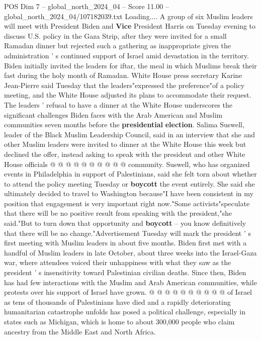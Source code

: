 \begin{textsample}{POS Dim 7 – global\_north\_2024\_04 – Score 11.00 – global\_north\_2024\_04/107182039.txt}  \label{ex:f7_pos_067}
Loading....
A group of six Muslim leaders will meet with President Biden and \textbf{Vice} President Harris on Tuesday evening to discuss U.S. policy in the Gaza Strip, after they were invited for a small Ramadan dinner but rejected such a gathering as inappropriate given the administration ' s continued support of Israel amid devastation in the territory.
Biden initially invited the leaders for iftar, the meal in which Muslims break their fast during the holy month of Ramadan.
White House press secretary Karine Jean-Pierre said Tuesday that the leaders"expressed the preference"of a policy meeting, and the White House adjusted its plans to accommodate their request.
The leaders ' refusal to have a dinner at the White House underscores the significant challenges Biden faces with the Arab American and Muslim communities seven months before the \textbf{presidential} \textbf{election}.
Salima Suswell, leader of the Black Muslim Leadership Council, said in an interview that she and other Muslim leaders were invited to dinner at the White House this week but declined the offer, instead asking to speak with the president and other White House officials @ @ @ @ @ @ @ @ @ @ community.
Suswell, who has organized events in Philadelphia in support of Palestinians, said she felt torn about whether to attend the policy meeting Tuesday or \textbf{boycott} the event entirely.
She said she ultimately decided to travel to Washington because"I have been consistent in my position that engagement is very important right now."Some activists"speculate that there will be no positive result from speaking with the president,"she said."But to turn down that opportunity and \textbf{boycott} -- you know definitively that there will be no change."Advertisement Tuesday will mark the president ' s first meeting with Muslim leaders in about five months.
Biden first met with a handful of Muslim leaders in late October, about three weeks into the Israel-Gaza war, where attendees voiced their unhappiness with what they saw as the president ' s insensitivity toward Palestinian civilian deaths.
Since then, Biden has had few interactions with the Muslim and Arab American communities, while protests over his support of Israel have grown. @ @ @ @ @ @ @ @ @ @ of Israel as tens of thousands of Palestinians have died and a rapidly deteriorating humanitarian catastrophe unfolds has posed a political challenge, especially in states such as Michigan, which is home to about 300,000 people who claim ancestry from the Middle East and North Africa.

\end{textsample}
